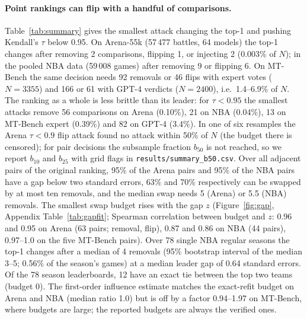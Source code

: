 \documentclass{article}
\begin{document}
\paragraph{Point rankings can flip with a handful of comparisons.}
Table~\ref{tab:summary} gives the smallest attack changing the top-1 and pushing Kendall's $\tau$ below 0.95. On Arena-55k (57\,477 battles, 64 models) the top-1 changes after removing 2 comparisons, flipping 1, or injecting 2 (0.003\% of $N$); in the pooled NBA data (59\,008 games) after removing 9 or flipping 6. On MT-Bench the same decision needs 92 removals or 46 flips with expert votes ($N=3355$) and 166 or 61 with GPT-4 verdicts ($N=2400$), i.e.\ 1.4--6.9\% of $N$. The ranking as a whole is less brittle than its leader: for $\tau<0.95$ the smallest attacks remove 56 comparisons on Arena (0.10\%), 21 on NBA (0.04\%), 13 on MT-Bench expert (0.39\%) and 82 on GPT-4 (3.4\%).
In one of six resamples the Arena $\tau<0.9$ flip attack found no attack within 50\% of $N$ (the budget there is censored); for pair decisions the subsample fraction $b_{50}$ is not reached, so we report $b_{10}$ and $b_{25}$ with grid flags in \texttt{results/summary\_b50.csv}. Over all adjacent pairs of the original ranking, 95\% of the Arena pairs and 95\% of the NBA pairs have a gap below two standard errors, 63\% and 70\% respectively can be swapped by at most ten removals, and the median swap needs 5 (Arena) or 5.5 (NBA) removals. The smallest swap budget rises with the gap $z$ (Figure~\ref{fig:gap}, Appendix Table~\ref{tab:gapfit}; Spearman correlation between budget and $z$: 0.96 and 0.95 on Arena (63 pairs; removal, flip), 0.87 and 0.86 on NBA (44 pairs), 0.97--1.0 on the five MT-Bench pairs). Over 78 single NBA regular seasons the top-1 changes after a median of 4 removals (95\% bootstrap interval of the median 3--5; 0.56\% of the season's games) at a median leader gap of 0.64 standard errors. Of the 78 season leaderboards, 12 have an exact tie between the top two teams (budget 0). The first-order influence estimate matches the exact-refit budget on Arena and NBA (median ratio 1.0) but is off by a factor 0.94--1.97 on MT-Bench, where budgets are large; the reported budgets are always the verified ones.
\end{document}
